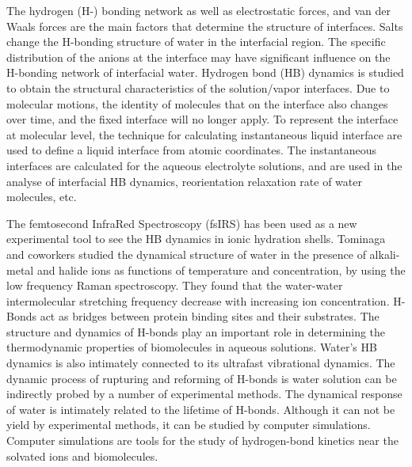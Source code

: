 %
The hydrogen (H-) bonding network \cite{Eisenberg1969,Speedy1976,Poole1994,Soper2008b,Nilsson2011,Ball2001,Pettersson2015} as well as electrostatic forces, 
and van der Waals forces are the main factors that determine the structure of interfaces. 
Salts change the H-bonding structure of water in the interfacial region\cite{EAR04,McLain2006,Ball2008}. 
The specific distribution of the anions at the interface may have significant influence on the H-bonding network of interfacial water\cite{Morita2008}.
Hydrogen bond (HB) dynamics is studied to obtain the structural characteristics of the solution/vapor interfaces.
Due to molecular motions, the identity of molecules that on the interface also changes over time\cite{Willard2010}, and the fixed interface will no longer apply. 
To represent the interface at molecular level, the technique for calculating instantaneous liquid interface are used to define a liquid interface from atomic coordinates.
The instantaneous interfaces are calculated for the aqueous electrolyte solutions, and are used in the analyse of interfacial HB dynamics, 
reorientation relaxation rate of water molecules, etc.

The femtosecond InfraRed Spectroscopy (fsIRS) has been used as a new experimental tool to see the HB dynamics in ionic hydration shells\cite{Laage2007}. 
Tominaga and coworkers studied the dynamical structure of water in the presence of alkali-metal and halide ions as functions of temperature and concentration, 
by using the low frequency Raman spectroscopy. 
They found that the water-water intermolecular stretching frequency decrease with increasing ion concentration\cite{KM98,Amo00}.
H-Bonds act as bridges between protein binding sites and their substrates\cite{Ball05}.
The structure and dynamics of H-bonds play an important role in determining the thermodynamic properties of biomolecules in aqueous solutions\cite{HX01}. 
Water’s HB dynamics is also intimately connected to its ultrafast vibrational dynamics\cite{Nagata15}. 
The dynamic process of rupturing and reforming of H-bonds is water solution can be indirectly probed by a number of experimental methods\cite{OC84,JT85}.
The dynamical response of water is intimately related to the lifetime of H-bonds\cite{SP05}. 
Although it can not be yield by experimental methods, it can be studied by computer simulations\cite{Rapaport1983,Voloshin2009}.
Computer simulations are tools for the study of hydrogen-bond kinetics near the solvated ions and biomolecules\cite{PJR79,YKC98}.

